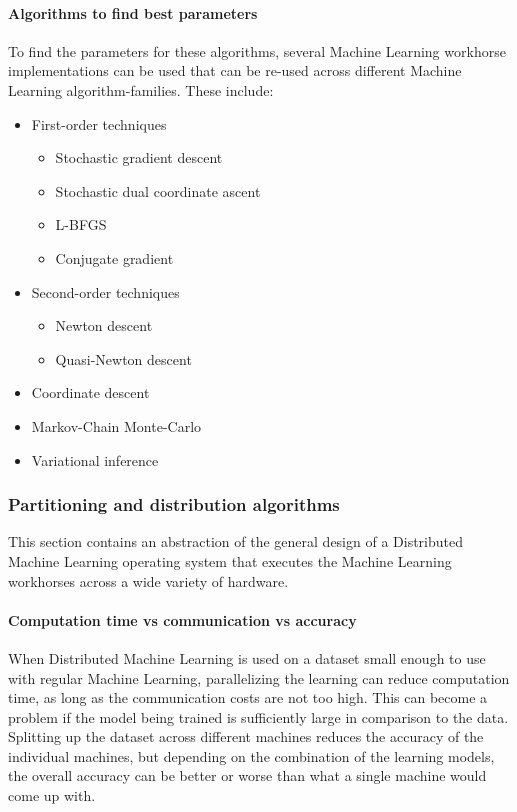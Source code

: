 \paragraph{Algorithms to find best parameters}
To find the parameters for these algorithms, several Machine Learning workhorse implementations can be used that can be re-used across different Machine Learning algorithm-families. These include:
\begin{itemize}
	\item First-order techniques
	\begin{itemize}
		\item Stochastic gradient descent
		\item Stochastic dual coordinate ascent\cite{Shal13}
		\item L-BFGS
		\item Conjugate gradient
	\end{itemize}
	\item Second-order techniques
	\begin{itemize}
		\item Newton descent
		\item Quasi-Newton descent
	\end{itemize}
	\item Coordinate descent
	\item Markov-Chain Monte-Carlo
	\item Variational inference
\end{itemize}




\subsubsection{Partitioning and distribution algorithms}
This section contains an abstraction of the general design of a Distributed Machine Learning operating system that executes the Machine Learning workhorses across a wide variety of hardware.


\paragraph{Computation time vs communication vs accuracy}

When Distributed Machine Learning is used on a dataset small enough to use with regular Machine Learning, parallelizing the learning can reduce computation time, as long as the communication costs are not too high. This can become a problem if the model being trained is sufficiently large in comparison to the data. Splitting up the dataset across different machines reduces the accuracy of the individual machines, but depending on the combination of the learning models, the overall accuracy can be better or worse than what a single machine would come up with.


